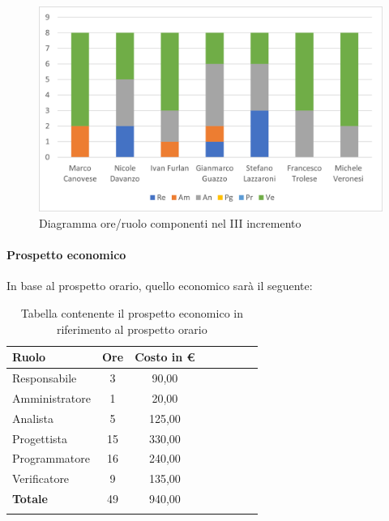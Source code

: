 \begin{figure}[H]
	\centering
	\includegraphics[width=0.8\linewidth]{res/images/preventivo/dettaglio_analisi/3-1.png}
	\caption{Diagramma ore/ruolo componenti nel III incremento}
	\label{fig:diagramma suddivisione ruoli III incremento}
\end{figure}

\paragraph{Prospetto economico}
In base al prospetto orario, quello economico sarà il seguente:

\begin{longtable}{|l|c|c|c|c|c|c|c|}
	\hline
	\rowcolor{lighter-grayer}
	\textbf{Ruolo}  & \textbf{Ore} & \textbf{Costo in €} \\
	\hline
	\endfirsthead

	\hline
	Responsabile    & 3            & 90,00              \\
	\hline
	\hline
	Amministratore  & 1            & 20,00               \\
	\hline
	\hline
	Analista        & 5           & 125,00              \\
	\hline
	\hline
	Progettista     & 15            & 330,00                   \\
	\hline
	\hline
	Programmatore   & 16            & 240,00                   \\
	\hline
	\hline
	Verificatore    & 9           & 135,00              \\
	\hline
	\textbf{Totale} & 49           & 940,00            \\
	\hline
	\rowcolor{white}
	\caption{Tabella contenente il prospetto economico in riferimento al prospetto orario}
\end{longtable}
\pagebreak

